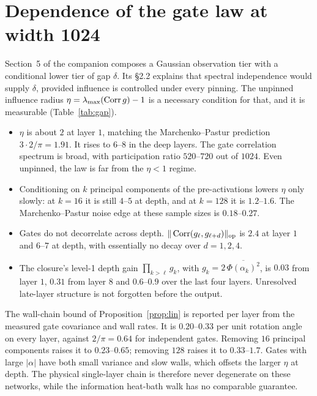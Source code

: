 \section{Dependence of the gate law at width 1024}\label{sec:dep}

Section~5 of the companion composes a Gaussian observation tier with a conditional lower tier of gap $\delta$. Its \S2.2
explains that spectral independence would supply $\delta$, provided influence is controlled under every pinning. The
unpinned influence radius $\eta=\lambda_{\max}(\operatorname{Corr} g)-1$ is a necessary condition for that, and it is measurable
(Table~\ref{tab:gap}).

\begin{itemize}[leftmargin=1.5em]
\item $\eta$ is about $2$ at layer $1$, matching the Marchenko--Pastur prediction $3\cdot2/\pi=1.91$. It rises to $6$--$8$
in the deep layers. The gate correlation spectrum is broad, with participation ratio $520$--$720$ out of $1024$. Even
unpinned, the law is far from the $\eta<1$ regime.
\item Conditioning on $k$ principal components of the pre-activations lowers $\eta$ only slowly: at $k=16$ it is still
$4$--$5$ at depth, and at $k=128$ it is $1.2$--$1.6$. The Marchenko--Pastur noise edge at these sample sizes is
$0.18$--$0.27$.
\item Gates do not decorrelate across depth. $\|\operatorname{Corr}(g_\ell,g_{\ell+d})\|_{\rm op}$ is $2.4$ at layer $1$ and $6$--$7$ at
depth, with essentially no decay over $d=1,2,4$.
\item The closure's level-1 depth gain $\prod_{k>\ell}g_k$, with $g_k=2\,\overline{\Phi(\alpha_k)^2}$, is $0.03$ from layer
$1$, $0.31$ from layer $8$ and $0.6$--$0.9$ over the last four layers. Unresolved late-layer structure is not forgotten
before the output.
\end{itemize}

The wall-chain bound of Proposition~\ref{prop:lin} is reported per layer from the measured gate covariance and wall rates.
It is $0.20$--$0.33$ per unit rotation angle on every layer, against $2/\pi=0.64$ for independent gates. Removing $16$
principal components raises it to $0.23$--$0.65$; removing $128$ raises it to $0.33$--$1.7$. Gates with large $|\alpha|$
have both small variance and slow walls, which offsets the larger $\eta$ at depth. The physical single-layer chain is
therefore never degenerate on these networks, while the information heat-bath walk has no comparable guarantee.

